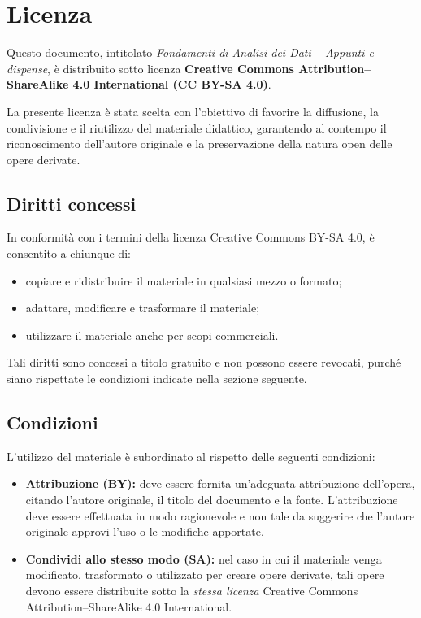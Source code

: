 \chapter*{Licenza}

\setlength{\parskip}{0.8em}
\setlength{\parindent}{0pt}

Questo documento, intitolato \emph{Fondamenti di Analisi dei Dati -- Appunti e dispense},
è distribuito sotto licenza \textbf{Creative Commons Attribution--ShareAlike 4.0
International (CC BY-SA 4.0)}.

La presente licenza è stata scelta con l'obiettivo di favorire la diffusione,
la condivisione e il riutilizzo del materiale didattico, garantendo al contempo
il riconoscimento dell'autore originale e la preservazione della natura open
delle opere derivate.

\vspace{1em}

\section*{Diritti concessi}

In conformità con i termini della licenza Creative Commons BY-SA 4.0, è consentito
a chiunque di:
\begin{itemize}
  \item copiare e ridistribuire il materiale in qualsiasi mezzo o formato;
  \item adattare, modificare e trasformare il materiale;
  \item utilizzare il materiale anche per scopi commerciali.
\end{itemize}

Tali diritti sono concessi a titolo gratuito e non possono essere revocati,
purché siano rispettate le condizioni indicate nella sezione seguente.

\vspace{1em}

\section*{Condizioni}

L'utilizzo del materiale è subordinato al rispetto delle seguenti condizioni:

\begin{itemize}
  \item \textbf{Attribuzione (BY):} deve essere fornita un'adeguata attribuzione
  dell'opera, citando l'autore originale, il titolo del documento e la fonte.
  L'attribuzione deve essere effettuata in modo ragionevole e non tale da suggerire
  che l'autore originale approvi l'uso o le modifiche apportate.

  \item \textbf{Condividi allo stesso modo (SA):} nel caso in cui il materiale
  venga modificato, trasformato o utilizzato per creare opere derivate, tali opere
  devono essere distribuite sotto la \emph{stessa licenza} Creative Commons
  Attribution--ShareAlike 4.0 International.
\end{itemize}

